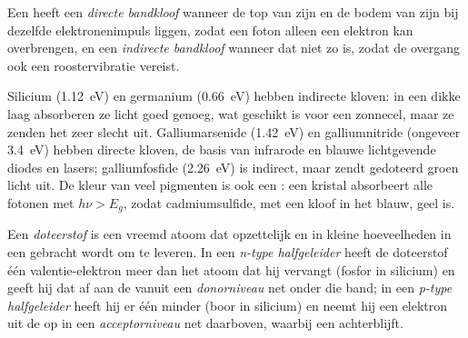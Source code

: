 \begin{definition}\label{def:b3:solid-state:gap-types}
Een  heeft een
\emph{directe bandkloof} wanneer de top van zijn
 en de bodem van zijn  bij dezelfde
elektronenimpuls liggen, zodat een foton alleen een elektron kan
overbrengen, en een
\emph{indirecte bandkloof} wanneer dat niet zo
is, zodat de overgang ook een roostervibratie vereist.
\end{definition}

Silicium (\qty{1.12}{eV}) en germanium (\qty{0.66}{eV}) hebben indirecte
kloven: in een dikke laag absorberen ze licht goed genoeg, wat geschikt
is voor een zonnecel, maar ze zenden het zeer slecht uit. Galliumarsenide
(\qty{1.42}{eV}) en galliumnitride (ongeveer
\qty{3.4}{eV}) hebben directe kloven, de basis van infrarode en blauwe
lichtgevende diodes en lasers; galliumfosfide (\qty{2.26}{eV}) is
indirect, maar zendt gedoteerd groen licht uit. De kleur van veel
pigmenten is ook een : een kristal
absorbeert alle fotonen met $h\nu > E_g$, zodat cadmiumsulfide, met een kloof in het blauw,
geel is.

\begin{definition}[Dotering]\label{def:b3:solid-state:doping}
Een \emph{doteerstof} is een vreemd atoom dat
opzettelijk en in kleine hoeveelheden in een  gebracht wordt
om  te leveren. In een
\emph{n-type halfgeleider} heeft de doteerstof
één valentie-elektron meer dan het atoom dat hij vervangt (fosfor in
silicium) en geeft hij dat af aan de  vanuit een
\emph{donorniveau} net onder die band; in een
\emph{p-type halfgeleider} heeft hij er één
minder (boor in silicium) en neemt hij een elektron uit de 
op in een
\emph{acceptorniveau} net daarboven, waarbij een 
achterblijft.
\end{definition}

